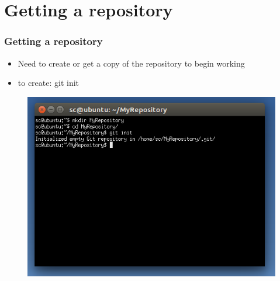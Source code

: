 \documentclass{beamer}
\begin{document}
\section{Getting a repository}
\begin{frame}
\frametitle{Getting a repository}
\begin{itemize}
\item Need to create or get a copy of the repository to begin working
\item to create: git init
\end{itemize}
\begin{figure}
\begin{center}
\includegraphics[scale=0.5]{gitinit}
\end{center}
\end{figure}
\end{frame}
\end{document}
